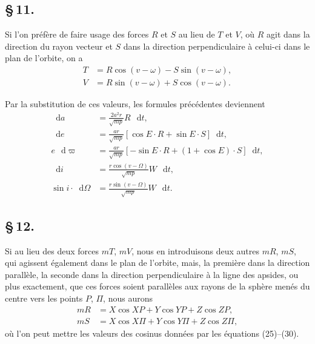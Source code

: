 \documentclass[12pt,a4paper]{article}
\newcommand{\dd}{\mathop{}\!\mathrm{d}}
\begin{document}
\newpage
\subsection*{\S\,11.}

Si l'on pr\'{e}f\`{e}re de faire usage des forces $R$ et $S$ au lieu de $T$ et $V$, o\`{u} $R$ agit dans la direction du rayon vecteur et $S$ dans la direction perpendiculaire \`{a} celui-ci dans le plan de l'orbite, on a
\begin{align}
T &= R\cos(v - \omega) - S\sin(v - \omega), \tag{55} \\
V &= R\sin(v - \omega) + S\cos(v - \omega). \tag{56}
\end{align}

Par la substitution de ces valeurs, les formules pr\'{e}c\'{e}dentes deviennent
\begin{align}
\dd a &= \frac{2a^2r}{\sqrt{mp}} R\,\dd t, \tag{57} \\
\dd e &= \frac{ar}{\sqrt{mp}}\left[\cos E \cdot R + \sin E \cdot S\right] \dd t, \tag{58} \\
e\,\dd\varpi &= \frac{ar}{\sqrt{mp}}\left[-\sin E \cdot R + (1 + \cos E) \cdot S\right] \dd t, \tag{59} \\
\dd i &= \frac{r\cos(v - \Omega)}{\sqrt{mp}} W\,\dd t, \tag{60} \\
\sin i \cdot \dd\Omega &= \frac{r\sin(v - \Omega)}{\sqrt{mp}} W\,\dd t. \tag{61}
\end{align}

\newpage
\subsection*{\S\,12.}

Si au lieu des deux forces $mT$, $mV$, nous en introduisons deux autres $mR$, $mS$, qui agissent \'{e}galement dans le plan de l'orbite, mais, la premi\`{e}re dans la direction parall\`{e}le, la seconde dans la direction perpendiculaire \`{a} la ligne des apsides, ou plus exactement, que ces forces soient parall\`{e}les aux rayons de la sph\`{e}re men\'{e}s du centre vers les points $P$, $\Pi$, nous aurons
\begin{align}
mR &= X\cos XP + Y\cos YP + Z\cos ZP, \tag{62} \\
mS &= X\cos X\Pi + Y\cos Y\Pi + Z\cos Z\Pi, \tag{63}
\end{align}
o\`{u} l'on peut mettre les valeurs des cosinus donn\'{e}es par les \'{e}quations (25)--(30).
\end{document}
